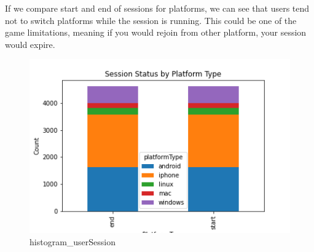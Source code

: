 If we compare start and end of sessions for platforms, we can see that users tend not to switch platforms while the session is running. This could be one of the game limitations, meaning if you would rejoin from other platform, your session would expire.
\begin{figure}[H]
\includegraphics[scale=0.85]{img/Graphs/userSession/histogram_userSession.png}
\centering
\caption{histogram\_userSession}
\label{fig:histogram_userSession}
\end{figure}